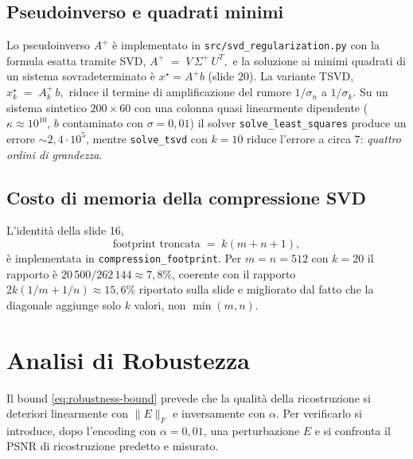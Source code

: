 \documentclass[11pt,a4paper]{article}
\theoremstyle{definition}
\theoremstyle{remark}
\begin{document}
\subsection{Pseudoinverso e quadrati minimi}

Lo pseudoinverso $A^{+}$ \`e implementato in \verb|src/svd_regularization.py|
con la formula esatta tramite SVD,
\(
   A^{+} \;=\; V \, \Sigma^{+} \, U^{T},
\)
e la soluzione ai minimi quadrati di un sistema sovradeterminato \`e
$x^{\star} = A^{+} b$ (slide 20).  La variante TSVD,
\(
   x^{\star}_{k} \;=\; A_{k}^{+} \, b,
\)
riduce il termine di amplificazione del rumore $1/\sigma_n$ a $1/\sigma_k$.
Su un sistema sintetico $200 \times 60$ con una colonna quasi
linearmente dipendente
(\,$\kappa \approx 10^{10}$, $b$ contaminato con $\sigma = 0{,}01$) il
solver \texttt{solve\_least\_squares} produce un errore $\sim 2{,}4 \cdot 10^{5}$,
mentre \texttt{solve\_tsvd} con $k = 10$ riduce l'errore a circa $7$:
\emph{quattro ordini di grandezza}.

\subsection{Costo di memoria della compressione SVD}

L'identit\`a della slide 16,
\[
   \text{footprint troncata} \;=\; k(m+n+1),
\]
\`e implementata in \verb|compression_footprint|.  Per $m=n=512$ con
$k=20$ il rapporto \`e $20\,500 / 262\,144 \approx 7{,}8\%$, coerente
con il rapporto $2k(1/m + 1/n) \approx 15{,}6\%$ riportato sulla slide
e migliorato dal fatto che la diagonale aggiunge solo $k$ valori,
non $\min(m,n)$.

\section{Analisi di Robustezza}
\label{sec:robustness}

Il bound \eqref{eq:robustness-bound} prevede che la qualità della
ricostruzione si deteriori linearmente con $\|E\|_F$ e inversamente
con $\alpha$.  Per verificarlo si introduce, dopo l'encoding con
$\alpha = 0{,}01$, una perturbazione $E$ e si confronta il PSNR di
ricostruzione predetto e misurato.
\end{document}
